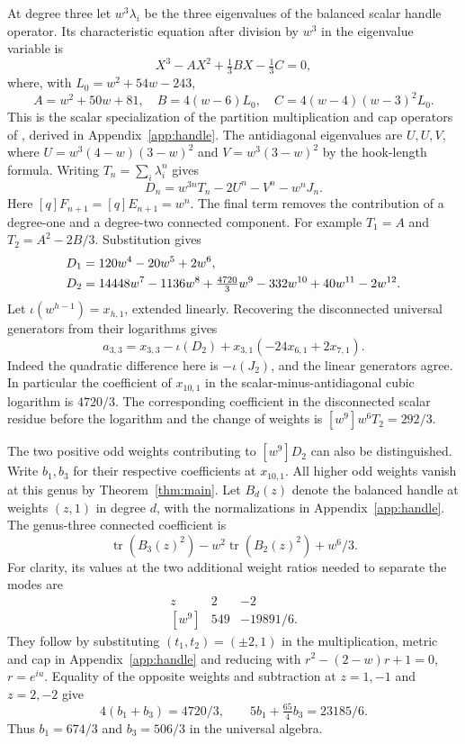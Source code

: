 At degree three let $w^3\lambda_i$ be the three eigenvalues of the
balanced scalar handle operator. Its characteristic equation after
division by $w^3$ in the eigenvalue variable is
\begin{equation}\label{eq:arith-char}
 X^3-AX^2+\tfrac13 BX-\tfrac13 C=0,
\end{equation}
where, with $L_0=w^2+54w-243$,
\[
 A=w^2+50w+81,\quad B=4(w-6)L_0,\quad
 C=4(w-4)(w-3)^2L_0.
\]
This is the scalar specialization of the partition multiplication and
cap operators of \cite[\S6 and Appendix]{BP}, derived in Appendix~\ref{app:handle}. The antidiagonal eigenvalues are
$U,U,V$, where $U=w^3(4-w)(3-w)^2$ and $V=w^3(3-w)^2$ by the
hook-length formula. Writing $T_n=\sum_i\lambda_i^n$ gives
\begin{equation}\label{eq:arith-difference}
 D_n=w^{3n}T_n-2U^n-V^n-w^n J_n.
\end{equation}
Here $[q]F_{n+1}=[q]E_{n+1}=w^n$. The final term removes the
contribution of a degree-one and a degree-two connected component.
For example $T_1=A$ and $T_2=A^2-2B/3$. Substitution gives
\begin{align}
 D_1&=120w^4-20w^5+2w^6,\notag\\
 D_2&=14448w^7-1136w^8+\tfrac{4720}{3}w^9
             -332w^{10}+40w^{11}-2w^{12}.\label{eq:arith-row}
\end{align}
Let $\iota(w^{h-1})=x_{h,1}$, extended linearly. Recovering the
disconnected universal generators from their logarithms gives
\[
 a_{3,3}=x_{3,3}-\iota(D_2)
          +x_{3,1}(-24x_{6,1}+2x_{7,1}).
\]
Indeed the quadratic difference here is $-\iota(J_2)$, and the
linear generators agree. In particular the coefficient of $x_{10,1}$
in the scalar-minus-antidiagonal cubic logarithm is $4720/3$. The corresponding
coefficient in the disconnected scalar residue before the logarithm
and the change of weights is $[w^9]w^6T_2=292/3$.

The two positive odd weights contributing to $[w^9]D_2$ can also
be distinguished. Write $b_1,b_3$ for their respective coefficients
at $x_{10,1}$. All higher odd weights vanish at this genus by
Theorem~\ref{thm:main}. Let $B_d(z)$ denote the balanced handle at
weights $(z,1)$ in degree $d$, with the normalizations in
Appendix~\ref{app:handle}. The genus-three connected coefficient is
\[
 \operatorname{tr}(B_3(z)^2)-w^2\operatorname{tr}(B_2(z)^2)+w^6/3.
\]
For clarity, its values at the two additional weight ratios needed to
separate the modes are
\[
\begin{array}{c|cc}
 z&2&-2\\ \hline
 [w^9]&549&-19891/6 .
\end{array}
\]
They follow by substituting $(t_1,t_2)=(\pm2,1)$ in the multiplication,
metric and cap in Appendix~\ref{app:handle} and reducing with
$r^2-(2-w)r+1=0$, $r=e^{iu}$. Equality of the opposite weights and
subtraction at $z=1,-1$ and $z=2,-2$ give
\[
 4(b_1+b_3)=4720/3,\qquad 5b_1+\tfrac{65}{4}b_3=23185/6.
\]
Thus $b_1=674/3$ and $b_3=506/3$ in the universal algebra.

